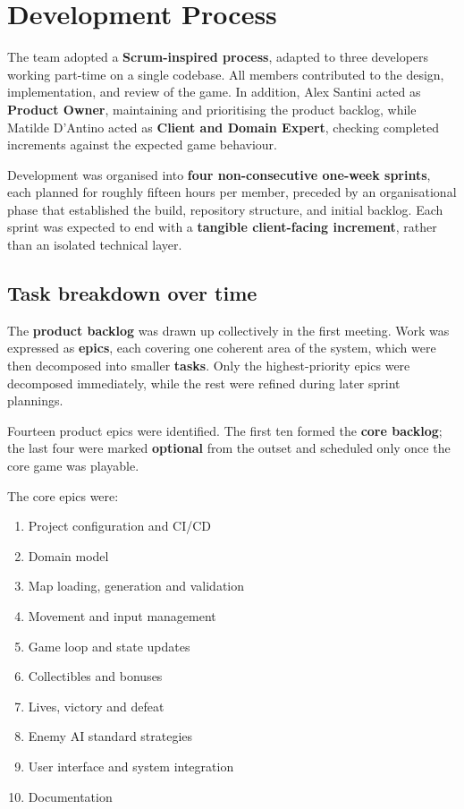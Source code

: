 \chapter{Development Process}

The team adopted a \textbf{Scrum-inspired process}, adapted to three developers working part-time on a single codebase.
All members contributed to the design, implementation, and review of the game. In addition, Alex Santini acted as
\textbf{Product Owner}, maintaining and prioritising the product backlog, while Matilde D'Antino acted as
\textbf{Client and Domain Expert}, checking completed increments against the expected game behaviour.

Development was organised into \textbf{four non-consecutive one-week sprints}, each planned for roughly fifteen hours per member,
preceded by an organisational phase that established the build, repository structure, and initial backlog. Each sprint
was expected to end with a \textbf{tangible client-facing increment}, rather than an isolated technical layer.

\section{Task breakdown over time}

The \textbf{product backlog} was drawn up collectively in the first meeting. Work was expressed as \textbf{epics}, each covering one
coherent area of the system, which were then decomposed into smaller \textbf{tasks}.
Only the highest-priority epics were decomposed immediately, while the rest were refined during later
sprint plannings.

Fourteen product epics were identified. The first ten formed the \textbf{core backlog}; the last four were marked
\textbf{optional} from the outset and scheduled only once the core game was playable.

The core epics were:

\begin{enumerate}
    \item Project configuration and CI/CD
    \item Domain model
    \item Map loading, generation and validation
    \item Movement and input management
    \item Game loop and state updates
    \item Collectibles and bonuses
    \item Lives, victory and defeat
    \item Enemy AI standard strategies
    \item User interface and system integration
    \item Documentation
\end{enumerate}

